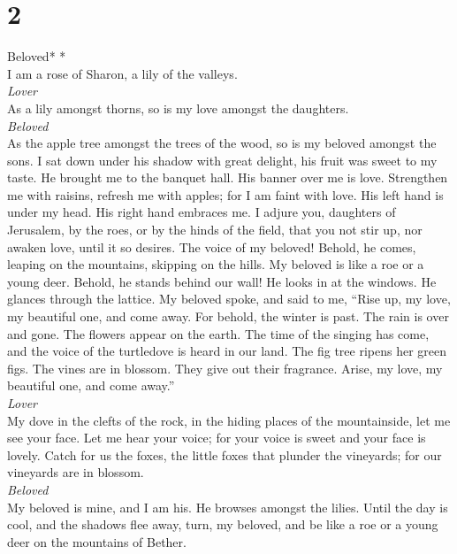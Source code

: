 \hypertarget{section-1}{%
\section{2}\label{section-1}}

\emph{\hfill\break
}Beloved* *\\

 I am a rose of Sharon, a lily of the valleys.\\
\emph{Lover}\\
 As a lily amongst thorns, so is my love amongst the
daughters.\\
\emph{Beloved}\\
 As the apple tree amongst the trees of the wood, so is my
beloved amongst the sons. I sat down under his shadow with great
delight, his fruit was sweet to my taste.  He brought me
to the banquet hall. His banner over me is love. 
Strengthen me with raisins, refresh me with apples; for I am faint with
love.  His left hand is under my head. His right hand
embraces me.  I adjure you, daughters of Jerusalem, by the
roes, or by the hinds of the field, that you not stir up, nor awaken
love, until it so desires.  The voice of my beloved!
Behold, he comes, leaping on the mountains, skipping on the hills.
 My beloved is like a roe or a young deer. Behold, he
stands behind our wall! He looks in at the windows. He glances through
the lattice.  My beloved spoke, and said to me, ``Rise
up, my love, my beautiful one, and come away.  For
behold, the winter is past. The rain is over and gone. 
The flowers appear on the earth. The time of the singing has come, and
the voice of the turtledove is heard in our land.  The
fig tree ripens her green figs. The vines are in blossom. They give out
their fragrance. Arise, my love, my beautiful one, and come away.''\\
\emph{Lover}\\
 My dove in the clefts of the rock, in the hiding places
of the mountainside, let me see your face. Let me hear your voice; for
your voice is sweet and your face is lovely.  Catch for
us the foxes, the little foxes that plunder the vineyards; for our
vineyards are in blossom.\\
\emph{Beloved}\\
 My beloved is mine, and I am his. He browses amongst the
lilies.  Until the day is cool, and the shadows flee
away, turn, my beloved, and be like a roe or a young deer on the
mountains of Bether.

